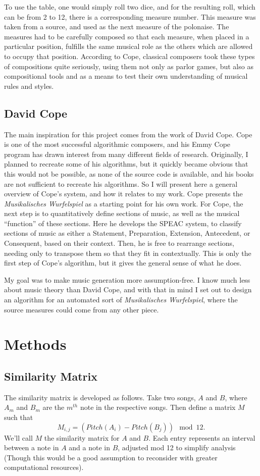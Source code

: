 \documentclass{article}
\begin{document}
To use the table, one would simply roll two dice, and for the resulting roll, which can be from 2 to 12, there is a corresponding measure number. This measure was taken from a source, and used as the next measure of the polonaise. The measures had to be carefully composed so that each measure, when placed in a particular position, fulfills the same musical role as the others which are allowed to occupy that position. According to Cope, classical composers took these types of compositions quite seriously, using them not only as parlor games, but also as compositional tools and as a means to test their own understanding of musical rules and styles.

\subsection{David Cope}
The main inspiration for this project comes from the work of David Cope. Cope is one of the most successful algorithmic composers, and his Emmy Cope program has drawn interest from many different fields of research. Originally, I planned to recreate some of his algorithms, but it quickly became obvious that this would not be possible, as none of the source code is available, and his books are not sufficient to recreate his algorithms. So I will present here a general overview of Cope's system, and how it relates to my work. Cope presents the \emph{Musikalisches Wurfelspiel} as a starting point for his own work. For Cope, the next step is to quantitatively define sections of music, as well as the musical ``function'' of these sections. Here he develops the SPEAC system, to classify sections of music as either a Statement, Preparation, Extension, Antecedent, or Consequent, based on their context. Then, he is free to rearrange sections, needing only to transpose them so that they fit in contextually. This is only the first step of Cope's algorithm, but it gives the general sense of what he does.

My goal was to make music generation more assumption-free. I know much less about music theory than David Cope, and with that in mind I set out to design an algorithm for an automated sort of \emph{Musikalisches Wurfelspiel}, where the source measures could come from any other piece.

\section{Methods}
\subsection{Similarity Matrix}
The similarity matrix is developed as follows. Take two songs, \(A\) and \(B\), where \(A_m\) and \(B_m\) are the \(m^{th}\) note in the respective songs. Then define a matrix \(M\) such that \[M_{i, j} = (Pitch(A_i) - Pitch(B_j)) \mod 12.\] We'll call \(M\) the similarity matrix for \(A\) and \(B\). Each entry represents an interval between a note in \(A\) and a note in \(B\), adjusted mod 12 to simplify analysis (Though this would be a good assumption to reconsider with greater computational resources).
\end{document}
